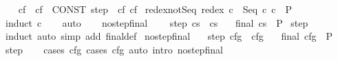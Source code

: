 \begin{isabellebody}
\ \isanewline
\ \ {\isachardoublequoteopen}{\isasymGamma}{\isasymturnstile}cf{}\ {\isasymrightarrow}\isactrlsup {\isacharplus}\ cf{}\ {\isasymequiv}\ {\isacharparenleft}CONST\ step\ {\isasymGamma}{\isacharparenright}\isactrlsup {\isacharplus}\isactrlsup {\isacharplus}\ cf{}\ cf{}{\isachardoublequoteclose}%
\isamarkuptrue%
\isamarkupfalse%
\ redex{\isacharunderscore}not{\isacharunderscore}Seq{\isacharcolon}\ {\isachardoublequoteopen}redex\ c\ {\isacharequal}\ Seq\ c{}\ c{}\ {\isasymLongrightarrow}\ P{\isachardoublequoteclose}\isanewline
%
\isadelimproof
\ \ %
\endisadelimproof
%
\isatagproof
{}\isamarkupfalse%
\ {\isacharparenleft}induct\ c{\isacharparenright}\isanewline
\ \ \isamarkupfalse%
\ auto\isanewline
\ \ \isamarkupfalse%
%
\endisatagproof
{\isafoldproof}%
%
\isadelimproof
\isanewline
%
\endisadelimproof
\isanewline
{}\isamarkupfalse%
\ no{\isacharunderscore}step{\isacharunderscore}final{\isacharcolon}\ \isanewline
\ \ \ step{\isacharcolon}\ {\isachardoublequoteopen}{\isasymGamma}{\isasymturnstile}{\isacharparenleft}c{\isacharcomma}s{\isacharparenright}\ {\isasymrightarrow}\ {\isacharparenleft}c{\isacharprime}{\isacharcomma}s{\isacharprime}{\isacharparenright}{\isachardoublequoteclose}\isanewline
\ \ \ {\isachardoublequoteopen}final\ {\isacharparenleft}c{\isacharcomma}s{\isacharparenright}\ {\isasymLongrightarrow}\ P{\isachardoublequoteclose}\isanewline
%
\isadelimproof
%
\endisadelimproof
%
\isatagproof
{}\isamarkupfalse%
\ step\isanewline
{}\isamarkupfalse%
\ induct\ {\isacharparenleft}auto\ simp\ add{\isacharcolon}\ final{\isacharunderscore}def{\isacharparenright}%
\endisatagproof
{\isafoldproof}%
%
\isadelimproof
\isanewline
%
\endisadelimproof
\isanewline
{}\isamarkupfalse%
\ no{\isacharunderscore}step{\isacharunderscore}final{\isacharprime}{\isacharcolon}\isanewline
\ \ \ step{\isacharcolon}\ {\isachardoublequoteopen}{\isasymGamma}{\isasymturnstile}cfg\ {\isasymrightarrow}\ cfg{\isacharprime}{\isachardoublequoteclose}\isanewline
\ \ \ {\isachardoublequoteopen}final\ cfg\ {\isasymLongrightarrow}\ P{\isachardoublequoteclose}\isanewline
%
\isadelimproof
%
\endisadelimproof
%
\isatagproof
{}\isamarkupfalse%
\ step\isanewline
\ \ \isamarkupfalse%
\ {\isacharparenleft}cases\ cfg{\isacharcomma}\ cases\ cfg{\isacharprime}{\isacharparenright}\ {\isacharparenleft}auto\ intro{\isacharcolon}\ no{\isacharunderscore}step{\isacharunderscore}final{\isacharparenright}%

\end{isabellebody}
